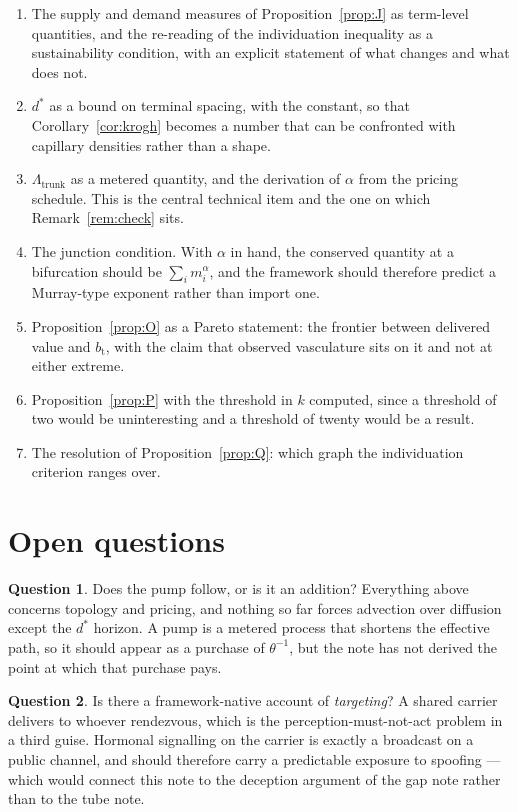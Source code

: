 \documentclass[11pt]{article}
\theoremstyle{plain}
\theoremstyle{definition}
\newtheorem{question}{Question}
\newcommand{\bt}{b_{\mathrm{t}}}
\begin{document}
\begin{enumerate}
\item The supply and demand measures of Proposition~\ref{prop:J} as term-level quantities, and the
re-reading of the individuation inequality as a sustainability condition, with an explicit statement
of what changes and what does not.
\item $d^{*}$ as a bound on terminal spacing, with the constant, so that
Corollary~\ref{cor:krogh} becomes a number that can be confronted with capillary densities rather
than a shape.
\item $\Lambda_{\mathrm{trunk}}$ as a metered quantity, and the derivation of $\alpha$ from the
pricing schedule. This is the central technical item and the one on which
Remark~\ref{rem:check} sits.
\item The junction condition. With $\alpha$ in hand, the conserved quantity at a bifurcation should be
$\sum_i m_i^{\alpha}$, and the framework should therefore predict a Murray-type exponent rather than
import one.
\item Proposition~\ref{prop:O} as a Pareto statement: the frontier between delivered value and
$\bt$, with the claim that observed vasculature sits on it and not at either extreme.
\item Proposition~\ref{prop:P} with the threshold in $k$ computed, since a threshold of two would be
uninteresting and a threshold of twenty would be a result.
\item The resolution of Proposition~\ref{prop:Q}: which graph the individuation criterion ranges over.
\end{enumerate}

\section{Open questions}
\label{sec:open}

\begin{question}
Does the pump follow, or is it an addition? Everything above concerns topology and pricing, and
nothing so far forces advection over diffusion except the $d^{*}$ horizon. A pump is a metered
process that shortens the effective path, so it should appear as a purchase of $\theta^{-1}$, but the
note has not derived the point at which that purchase pays.
\end{question}

\begin{question}
Is there a framework-native account of \emph{targeting}? A shared carrier delivers to whoever
rendezvous, which is the perception-must-not-act problem in a third guise. Hormonal signalling on the
carrier is exactly a broadcast on a public channel, and should therefore carry a predictable exposure
to spoofing --- which would connect this note to the deception argument of the gap note rather than to
the tube note.
\end{question}
\end{document}
